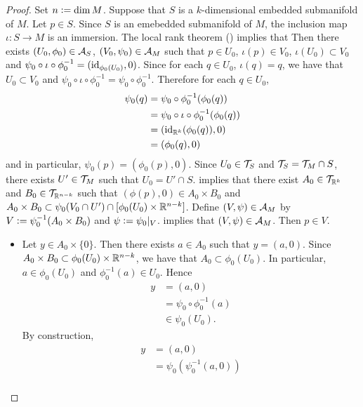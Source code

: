 \documentclass{book}
\begin{document}
	\begin{proof}
		Set $n \vcentcolon= \dim M$. Suppose that $S$ is a $k$-dimensional embedded submanifold of $M$. Let $p \in S$. Since $S$ is an emebedded submanifold of $M$, the inclusion map $\iota: S \rightarrow M$ is an immersion. The local rank theorem () implies that Then there exists $(U_0, \phi_0) \in \mathcal{A}_S$, $(V_0, \psi_0) \in \mathcal{A}_M$ such that $p \in U_0$, $\iota(p) \in V_0$, $\iota(U_0) \subset V_0$ and $\psi_0 \circ \iota \circ \phi_0^{-1} = (\operatorname{id}_{\phi_0(U_0)}, 0)$. Since for each $q \in U_0$, $\iota(q) = q$, we have that $U_0 \subset V_0$ and $\psi_0 \circ \iota \circ \phi_0^{-1} = \psi_0 \circ \phi_0^{-1}$. Therefore for each $q \in U_0$,
		\begin{align*}
			\psi_0(q)
			& =  \psi_0 \circ \phi_0^{-1} (\phi_0(q)) \\
			& = \psi_0 \circ \iota \circ \phi_0^{-1} (\phi_0(q)) \\
			& = (\operatorname{id}_{\mathbb{R}^k}(\phi_0(q)), 0) \\
			& = (\phi_0(q), 0)
		\end{align*}
		and in particular, $\psi_0(p) = (\phi_0(p), 0)$. Since $U_0 \in \mathcal{T}_S$ and $\mathcal{T}_S = \mathcal{T}_M \cap S$, there exists $U' \in \mathcal{T}_M$ such that $U_0 = U' \cap S$.  implies that there exist $A_0 \in \mathcal{T}_{\mathbb{R}^k}$ and $B_0 \in \mathcal{T}_{\mathbb{R}^{n-k}}$ such that $(\phi(p), 0) \in A_0 \times B_0$ and $A_0 \times B_0 \subset \psi_0(V_0 \cap U') \cap [\phi_0(U_0) \times \mathbb{R}^{n-k}]$. Define $(V, \psi) \in \mathcal{A}_{M}$ by $V \vcentcolon= \psi_0^{-1}(A_0 \times B_0)$ and $\psi \vcentcolon= \psi_0|_V$.  implies that $(V, \psi) \in \mathcal{A}_M$. Then $p \in V$. 
		\begin{itemize}
			\item Let $y \in A_0 \times \{0\}$. Then there exists $a \in A_0$ such that $y = (a,0)$. Since $A_0 \times B_0 \subset \phi_0(U_0) \times \mathbb{R}^{n-k}$, we have that $A_0 \subset \phi_0(U_0)$. In particular, $a \in \phi_0(U_0)$ and $\phi_0^{-1}(a) \in U_0$. Hence
			\begin{align*}
				y
				& = (a, 0) \\
				& = \psi_0 \circ \phi_0^{-1}(a) \\
				& \in \psi_0(U_0).
			\end{align*} 
			By construction,
			\begin{align*}
				y
				& = (a, 0) \\
				& = \psi_0(\psi_0^{-1}(a,0)) \\

\end{align*}
\end{itemize}
\end{proof}
\end{document}
